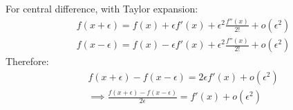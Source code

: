 \documentclass{article}
\begin{document}
For central difference, with Taylor expansion:
\begin{equation}
\begin{split}
&f(x+\epsilon)=f(x)+\epsilon f'(x)+\epsilon^2\frac{f''(x)}{2!}
+o(\epsilon^2)\\
&f(x-\epsilon)=f(x)-\epsilon f'(x)+\epsilon^2\frac{f''(x)}{2!}
+o(\epsilon^2)
\end{split}
\end{equation}
Therefore:
\begin{equation}
\begin{split}
&f(x+\epsilon)-f(x-\epsilon)=2\epsilon f'(x)+o(\epsilon^2)\\
&\implies \frac{f(x+\epsilon)-f(x-\epsilon)}{2\epsilon}=f'(x)+o(\epsilon^2)
\end{split}
\end{equation}
\end{document}
